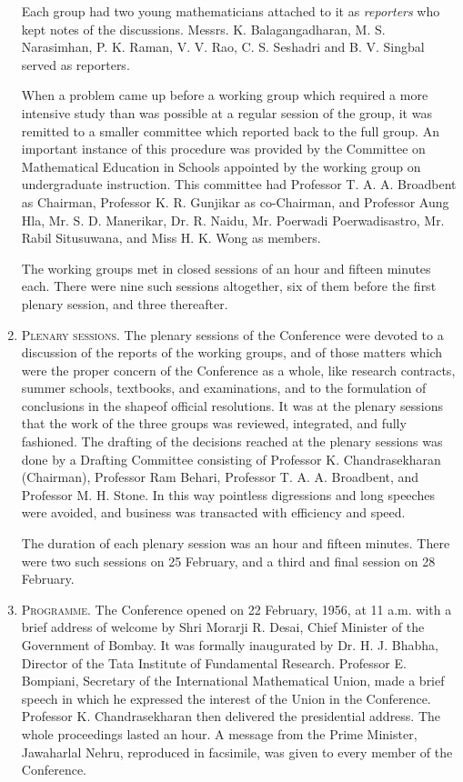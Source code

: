 \begin{enumerate}
Each group had two young mathematicians attached to it as {\em reporters} who kept notes of the discussions. Messrs. K. Balagangadharan, M. S. Narasimhan, P. K. Raman, V. V. Rao, C. S. Seshadri and B. V. Singbal served as reporters.

When a problem came up before a working group which required a more intensive study than was possible at a regular session of the group, it was remitted to a smaller committee which reported back to the full group. An important instance of this procedure was provided by the Committee on Mathematical Education in Schools appointed by the working group on undergraduate instruction. This committee had Professor T. A. A. Broadbent as Chairman, Professor K. R. Gunjikar as co-Chairman, and Professor Aung Hla, Mr. S. D. Manerikar, Dr. R. Naidu, Mr. Poerwadi Poerwadisastro, Mr. Rabil Situsuwana, and Miss H. K. Wong as members.

The working groups met in closed sessions of an hour and fifteen minutes each. There were nine such sessions altogether, six of them before the first plenary session, and three thereafter.

\item \textsc{Plenary sessions.} The plenary sessions of the Conference were devoted to a discussion of the reports of the working groups, and of those matters which were the proper concern of the Conference as a whole, like research contracts, summer schools, textbooks, and examinations, and to the formulation of conclusions in the shape\pageoriginale of official resolutions. It was at the plenary sessions that the work of the three groups was reviewed, integrated, and fully fashioned. The drafting of the decisions reached at the plenary sessions was done by a Drafting Committee consisting of Professor K. Chandrasekharan (Chairman), Professor Ram Behari, Professor T. A. A. Broadbent, and Professor M. H. Stone. In this way pointless digressions and long speeches were avoided, and business was transacted with efficiency and speed.

The duration of each plenary session was an hour and fifteen minutes. There were two such sessions on 25 February, and a third and final session on 28 February.

\item \textsc{Programme.} The Conference opened on 22 February, 1956, at 11 a.m. with a brief address of welcome by Shri Morarji R. Desai, Chief Minister of the Government of Bombay. It was formally inaugurated by Dr. H. J. Bhabha, Director of the Tata Institute of Fundamental Research. Professor E. Bompiani, Secretary of the International Mathematical Union, made a brief speech in which he expressed the interest of the Union in the Conference. Professor K. Chandrasekharan then delivered the presidential address. The whole proceedings lasted an hour. A message from the Prime Minister, Jawaharlal Nehru, reproduced in facsimile, was given to every member of the Conference.


\end{enumerate}
